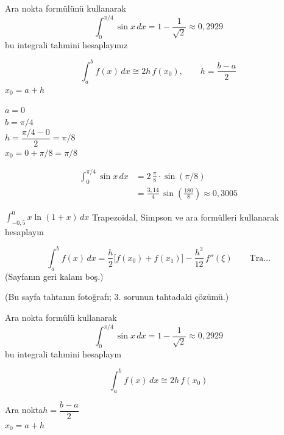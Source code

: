 \documentclass[11pt,a4paper]{article}
\begin{document}
\begin{ornek}[3]
Ara nokta formülünü kullanarak
\[
  \int_0^{\pi/4} \sin x\,dx = 1 - \frac{1}{\sqrt{2}} \approx 0{,}2929
\]
bu integrali tahmini hesaplayınız
\end{ornek}
\begin{cozum}
\noindent
\begin{minipage}[t]{0.62\linewidth}
\[
  \int_a^b f(x)\,dx \cong 2h\,f(x_0), \qquad h = \frac{b-a}{2}
\]
\hspace*{0.6\linewidth}$x_0 = a + h$
\end{minipage}\hfill
\begin{minipage}[t]{0.35\linewidth}
$a = 0$\\
$b = \pi/4$\\
$h = \dfrac{\pi/4 - 0}{2} = \pi/8$\\[2mm]
$x_0 = 0 + \pi/8 = \pi/8$
\end{minipage}

\begin{align*}
  \int_0^{\pi/4} \sin x\,dx &= 2\,\frac{\pi}{8}\cdot\sin(\pi/8)\\
  &= \frac{3{,}14}{4}\,\sin\left(\frac{180}{8}\right) \approx 0{,}3005
\end{align*}
\end{cozum}

\begin{ornek}[4]
$\displaystyle\int_{-0{,}5}^{0} x\ln(1+x)\,dx$ \qquad Trapezoidal, Simpson ve ara formülleri
kullanarak hesaplayın
\end{ornek}
\[
  \int_a^b f(x)\,dx = \frac{h}{2}\Big[f(x_0) + f(x_1)\Big] - \frac{h^3}{12}\,f''(\xi) \qquad \text{Tra\ldots}
\]
{\small\color{kursunkalem}(Sayfanın geri kalanı boş.)}

{\small\color{kursunkalem}(Bu sayfa tahtanın fotoğrafı; 3. sorunun tahtadaki çözümü.)}

\begin{ornek}[3]
Ara nokta formülü kullanarak
\[
  \int_0^{\pi/4} \sin x\,dx = 1 - \frac{1}{\sqrt{2}} \approx 0{,}2929
\]
bu integrali tahmini hesaplayın
\end{ornek}

\noindent
\begin{minipage}[c]{0.55\linewidth}
\[
  \boxed{\int_a^b f(x)\,dx \cong 2h\,f(x_0)}
\]
\end{minipage}\hfill
\begin{minipage}[c]{0.4\linewidth}
{\small Ara nokta}\qquad $h = \dfrac{b-a}{2}$\\[1mm]
\hspace*{5.2em}$x_0 = a + h$
\end{minipage}
\end{document}
